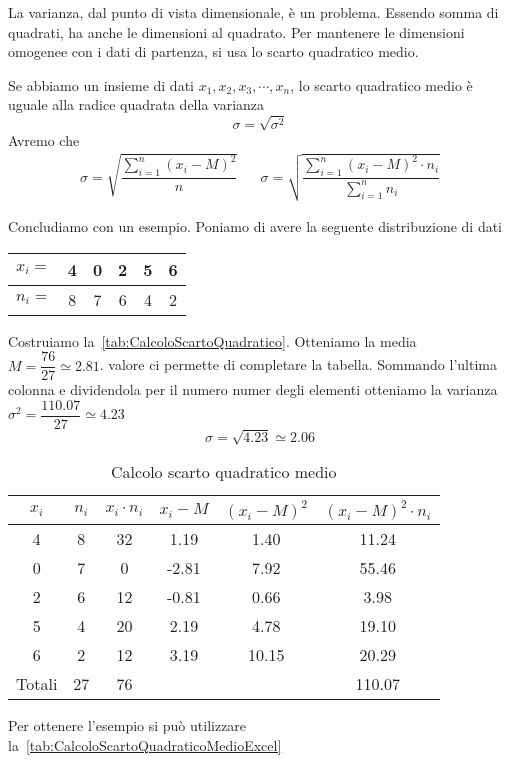 La varianza,  dal punto di vista dimensionale, è un problema.  Essendo somma di quadrati, ha anche le dimensioni al quadrato. Per mantenere le dimensioni omogenee con i dati  di partenza, si usa lo scarto quadratico medio. 
\begin{defn}
	Se abbiamo un insieme di dati $x_{1},x_{2},x_{3},\cdots,x_{n}$, lo scarto quadratico medio è  uguale alla radice quadrata della varianza \[\sigma=\sqrt{\sigma^2} \]
	Avremo che 
	\begin{align*}
		\sigma=\sqrt{\dfrac{\sum_{i=1}^{n}(x_{i}-M)^2}{n}}&&\sigma=\sqrt{\dfrac{\sum_{i=1}^{n}(x_{i}-M)^{2}\cdot n_{i}}{\sum_{i=1}^{n} n_{i}}}
	\end{align*}
\end{defn}
Concludiamo con un esempio. Poniamo di avere la seguente distribuzione di dati
\begin{center}
	\begin{tabular}{l*{5} {S[table-format=1.0]}}
		{$x_{i}=$}	&4  &0  &2  &5  &6\\
		\midrule 
		{$n_{i}=$}	&8 &7  &6 &4 &2\\   
	\end{tabular}
\end{center}
Costruiamo la~\vref{tab:CalcoloScartoQuadratico}. Otteniamo la media  $M=\dfrac{76}{27}\simeq\num{2.81}$.  valore ci permette di completare la tabella. Sommando l'ultima colonna e dividendola per il  numero numer degli elementi otteniamo la varianza $\sigma^2=\dfrac{110.07}{27}\simeq\num{4.23}$
\[\sigma=\sqrt{4.23}\simeq\num{2.06}\]
\begin{table}
	\centering
	\begin{tabular}{S[table-format=1.0]S[table-format=2.0]S[table-format=2.0]S[table-format=1.2]S[table-format=1.4]S[table-format=2.4] }
		\toprule
		{$x_i$}	&{$n_i$}  & {$x_i\cdot n_i$} & {$x_i-M$} & {$(x_i-M )^2$} & {$(x_i-M)^2\cdot n_i $ } \\
			& 8 & 32  & 1.19 &1.40  & 11.24 \\ 
		0	& 7 & 0 & -2.81 &7.92  & 55.46 \\ 
		2	& 6 & 12 & -0.81 &0.66  & 3.98 \\ 
		5	& 4 & 20& 2.19&4.78   & 19.10 \\ 
		6	& 2 & 12 & 3.19 &10.15  &20.29 \\
		\midrule 
		{Totali}& 27& 76 &  &  & 110.07 \\
		\bottomrule 
	\end{tabular} 
	\caption{Calcolo scarto quadratico medio}
	\label{tab:CalcoloScartoQuadratico}
\end{table}
Per ottenere l'esempio si può utilizzare la~\vref{tab:CalcoloScartoQuadraticoMedioExcel}
